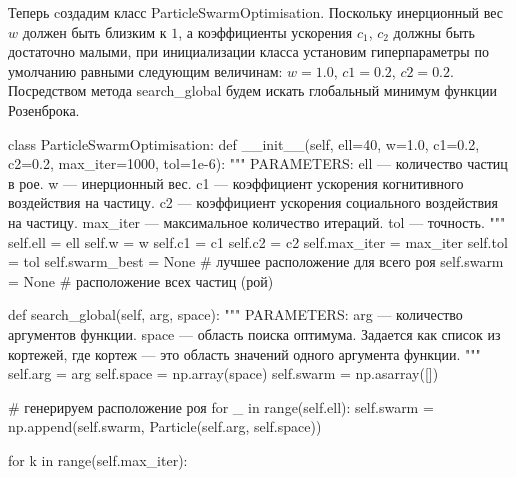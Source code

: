 Теперь cоздадим класс ParticleSwarmOptimisation. Поскольку инерционный вес $w$ должен быть близким к $1$, а коэффициенты ускорения $c_1$, $c_2$ должны быть достаточно малыми, при инициализации класса установим гиперпараметры по умолчанию равными следующим величинам: $w=1.0$, $c1=0.2$, $c2=0.2$. Посредством метода search\_global будем искать глобальный минимум функции Розенброка.

\begin{pyin}
class ParticleSwarmOptimisation:
  def __init__(self, ell=40, w=1.0, c1=0.2, c2=0.2, max_iter=1000,
	       tol=1e-6):
    """
    PARAMETERS:
    ell --- количество частиц в рое.
    w --- инерционный вес.
    c1 --- коэффициент ускорения когнитивного воздействия на частицу.
    c2 --- коэффициент ускорения социального воздействия на частицу.
    max_iter --- максимальное количество итераций.
    tol --- точность.
    """
    self.ell = ell
    self.w = w
    self.c1 = c1
    self.c2 = c2
    self.max_iter = max_iter
    self.tol = tol
    self.swarm_best = None # лучшее расположение для всего роя
    self.swarm = None      # расположение всех частиц (рой)

  def search_global(self, arg, space):
    """
    PARAMETERS:
    arg --- количество аргументов функции.
    space --- область поиска оптимума. Задается как список из
    кортежей, где кортеж --- это область значений
    одного аргумента функции.
    """
    self.arg = arg
    self.space = np.array(space)
    self.swarm = np.asarray([])

    # генерируем расположение роя
    for _ in range(self.ell):
       self.swarm = np.append(self.swarm,
                              Particle(self.arg, self.space))

    for k in range(self.max_iter):
\end{pyin}

